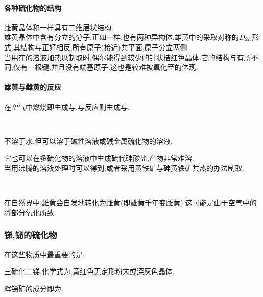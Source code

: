 \documentclass{ctexart}
\begin{document}
\paragraph{各种硫化物的结构}
雌黄晶体和一样具有二维层状结构.\\
\indent 雄黄晶体中含有分立的分子.正如一样,也有两种异构体.雄黄中的采取对称的$D_{2\text d}$形式,其结构与正好相反,所有原子(接近)共平面,原子分立两侧.\\
\indent 当用在的溶液加热以制取时,偶尔能得到较少的针状桔红色晶体.它的结构与有所不同,仅有一根键,并且没有端基原子.这也是较难被氧化至的体现.
\paragraph{雄黄与雌黄的反应}
在空气中燃烧即生成与.与反应则生成与.
\begin{center}
    \\
\end{center}
不溶于水,但可以溶于碱性溶液或碱金属硫化物的溶液.
\begin{center}
\end{center}
它也可以在多硫化物的溶液中生成硫代砷酸盐,产物非常难溶.\\
\indent 当用沸腾的溶液处理时可以得到;或者采用黄铁矿与砷黄铁矿共热的办法制取.
\begin{center}
    \\
\end{center}
在自然界中,雄黄会自发地转化为雌黄(即雄黄千年变雌黄).这可能是由于空气中的将部分氧化所致.
\begin{center}
\end{center}

\subsubsection{锑,铋的硫化物}
在这些物质中最重要的是.
\begin{substance}[\ce{Sb2S3}]
    三硫化二锑,化学式为,黄红色无定形粉末或深灰色晶体.
\end{substance}
辉锑矿的成分即为.
\end{document}
